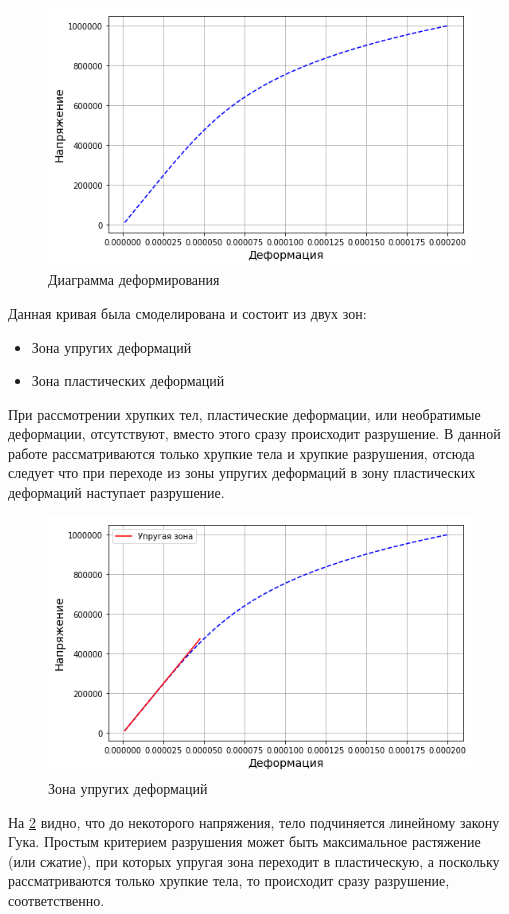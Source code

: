 \begin{figure}
	\centering
	\includegraphics[width=0.65 \textwidth]{images/part2/stress_strain_1.png}
	\caption{Диаграмма деформирования}
	\label{fig:stress_strain_1}
\end{figure}

Данная кривая была смоделирована и состоит из двух зон:
\begin{itemize}
	\item Зона упругих деформаций
	\item Зона пластических деформаций
\end{itemize}

При рассмотрении хрупких тел, пластические деформации, или необратимые деформации, отсутствуют, вместо этого сразу происходит разрушение. В данной работе рассматриваются только хрупкие тела и хрупкие разрушения, отсюда следует что при переходе из зоны упругих деформаций в зону пластических деформаций наступает разрушение. 

\begin{figure}
	\centering
	\includegraphics[width=0.65 \textwidth]{images/part2/linear_zone.png}
	\caption{Зона упругих деформаций}
	\label{fig:linear_zone}
\end{figure}

\newpage
На \ref{fig:linear_zone} видно, что до некоторого напряжения, тело подчиняется линейному закону Гука. Простым критерием разрушения может быть максимальное растяжение (или сжатие), при которых упругая зона переходит в пластическую, а поскольку рассматриваются только хрупкие тела, то происходит сразу разрушение, соответственно.

